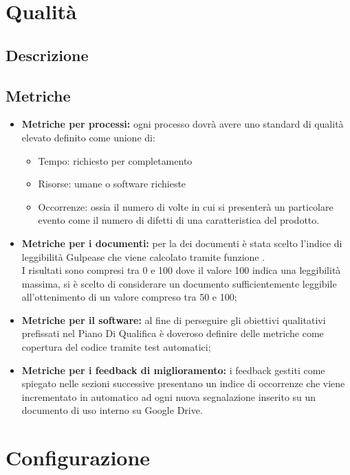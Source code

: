 \documentclass[NormeDiProgetto.tex]{subfiles}
\begin{document}
	\section{Qualità}
	\subsection{Descrizione}%
	\subsection{Metriche}
	\begin{itemize}
		\item \textbf{Metriche per processi:} ogni processo dovrà avere uno standard di qualità elevato definito come unione di:
		\begin{itemize}
			\item Tempo: richiesto per completamento
			\item Risorse: umane o software richieste
			\item Occorrenze: ossia il numero di volte in cui si presenterà un particolare evento come il numero di difetti di una caratteristica del prodotto.
		\end{itemize} 
		
		\item \textbf{Metriche per i documenti:} per la  dei documenti è stata scelto l'indice di leggibilità Gulpease che viene calcolato tramite funzione .\\
		I risultati sono compresi tra 0 e 100 dove il valore 100 indica una leggibilità massima, si è scelto di considerare un documento sufficientemente leggibile all'ottenimento di un valore compreso tra 50 e 100; 
		
		\item \textbf{Metriche per il software:} al fine di perseguire gli obiettivi qualitativi prefissati nel Piano Di Qualifica è doveroso definire delle metriche come copertura del codice tramite test automatici;
		
		\item \textbf{Metriche per i feedback di miglioramento:} i feedback gestiti come spiegato nelle sezioni successive presentano un indice di occorrenze che viene incrementato in automatico ad ogni nuova segnalazione inserito su un documento di uso interno su Google Drive. 
	\end{itemize}

	
	\section{Configurazione}
	
\end{document}
